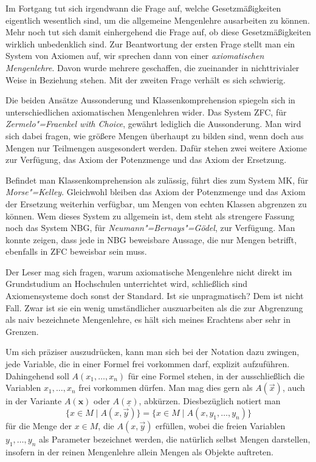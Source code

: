 Im Fortgang tut sich irgendwann die Frage auf, welche Gesetzmäßigkeiten
eigentlich wesentlich sind, um die allgemeine Mengenlehre ausarbeiten
zu können. Mehr noch tut sich damit einhergehend die Frage auf, ob diese
Gesetzmäßigkeiten wirklich unbedenklich sind. Zur Beantwortung der
ersten Frage stellt man ein System von Axiomen auf, wir sprechen dann
von einer \emph{axiomatischen Mengenlehre}. Davon wurde mehrere
geschaffen, die zueinander in nichttrivialer Weise in Beziehung stehen.
Mit der zweiten Frage verhält es sich schwierig.

Die beiden Ansätze Aussonderung und Klassenkomprehension spiegeln
sich in unterschiedlichen axiomatischen Mengenlehren wider. Das
System ZFC, für \emph{Zermelo"=Fraenkel with Choice}, gewährt lediglich
die Aussonderung. Man wird sich dabei fragen, wie größere Mengen
überhaupt zu bilden sind, wenn doch aus Mengen nur Teilmengen ausgesondert
werden. Dafür stehen zwei weitere Axiome zur Verfügung, das Axiom der
Potenzmenge und das Axiom der Ersetzung.

Befindet man Klassenkomprehension als zulässig, führt dies zum
System MK, für \emph{Morse"=Kelley}. Gleichwohl bleiben das Axiom der
Potenzmenge und das Axiom der Ersetzung weiterhin verfügbar, um Mengen
von echten Klassen abgrenzen zu können. Wem dieses System zu allgemein
ist,  dem steht als strengere Fassung noch das System NBG, für
\emph{Neumann"=Bernays"=Gödel}, zur Verfügung. Man konnte zeigen,
dass jede in NBG beweisbare Aussage, die nur Mengen betrifft,
ebenfalls in ZFC beweisbar sein muss.

Der Leser mag sich fragen, warum axiomatische Mengenlehre
nicht direkt im Grundstudium an Hochschulen unterrichtet wird,
schließlich sind Axiomensysteme doch sonst der Standard. Ist sie
unpragmatisch? Dem ist nicht Fall. Zwar ist sie ein wenig umständlicher
auszuarbeiten als die zur Abgrenzung als naiv bezeichnete Mengenlehre,
es hält sich meines Erachtens aber sehr in Grenzen.

Um sich präziser auszudrücken, kann man sich bei der Notation dazu
zwingen, jede Variable, die in einer Formel frei vorkommen darf,
explizit aufzuführen. Dahingehend soll $A(x_1,\ldots,x_n)$ für eine
Formel stehen, in der ausschließlich die Variablen $x_1,\ldots,x_n$
frei vorkommen dürfen. Man mag dies gern als $A(\vec x)$, auch
in der Variante $A(\mathbf x)$ oder $A(\underline x)$, abkürzen. Diesbezüglich
notiert man
\[\{x\in M\mid A(x,\vec y)\} = \{x\in M\mid A(x,y_1,\ldots,y_n)\}\]
für die Menge der $x\in M$, die $A(x,\vec y)$ erfüllen, wobei die freien
Variablen $y_1,\ldots, y_n$ als Parameter bezeichnet werden, die natürlich
selbst Mengen darstellen, insofern in der reinen Mengenlehre allein Mengen als
Objekte auftreten.

